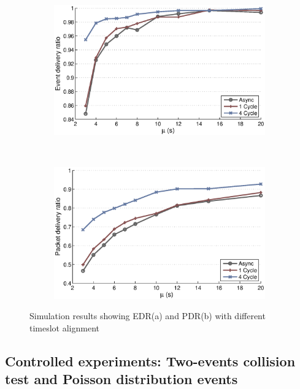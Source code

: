 \begin{figure}[p]
    \centering
    \begin{subfigure}[t]{0.8\textwidth}
        \centering
        \includegraphics[width=\textwidth] {../../sw/pc/matlab/simulation-result/slotting-edr-250evt.eps}
        \caption{}
    \end{subfigure} 
    \\
    \begin{subfigure}[t]{0.8\textwidth}
        \centering
        \includegraphics[width=\textwidth] {../../sw/pc/matlab/simulation-result/slotting-pdr-250evt.eps}
        \caption{}
    \end{subfigure}
    \caption[EDR and PDR with different timeslot alignment]{Simulation results showing EDR(a) and PDR(b) with different timeslot alignment}\label{fig:edr-pdr-slotting}
\end{figure}

\subsection{Controlled experiments: Two-events collision test and Poisson distribution events}

